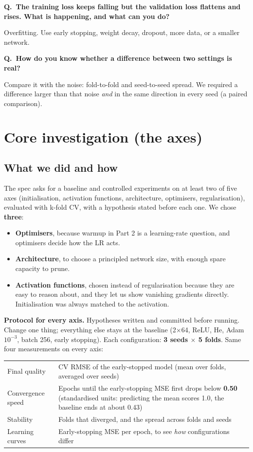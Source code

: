 \documentclass[11pt,a4paper]{article}
\newcounter{qnum}
\newcommand{\Q}[1]{\refstepcounter{qnum}\par\medskip\noindent\textbf{Q\theqnum.\ #1}\par\nopagebreak\noindent\ignorespaces}
\begin{document}
\Q{The training loss keeps falling but the validation loss flattens and rises. What is happening, and what can you do?}
Overfitting. Use early stopping, weight decay, dropout, more data, or a smaller network.

\Q{How do you know whether a difference between two settings is real?}
Compare it with the noise: fold-to-fold and seed-to-seed spread. We required a difference larger than that noise
\emph{and} in the same direction in every seed (a paired comparison).

\newpage
\section{Core investigation (the axes)}
\label{sec:core}

\subsection{What we did and how}
The spec asks for a baseline and controlled experiments on at least two of five axes (initialisation, activation
functions, architecture, optimisers, regularisation), evaluated with k-fold CV, with a hypothesis stated before each
one. We chose \textbf{three}:
\begin{itemize}
  \item \textbf{Optimisers}, because warmup in Part 2 is a learning-rate question, and optimisers decide how the LR acts.
  \item \textbf{Architecture}, to choose a principled network size, with enough spare capacity to prune.
  \item \textbf{Activation functions}, chosen instead of regularisation because they are easy to reason about, and they
        let us show vanishing gradients directly. Initialisation was always matched to the activation.
\end{itemize}

\textbf{Protocol for every axis.} Hypotheses written and committed before running. Change one thing; everything else stays
at the baseline (2$\times$64, ReLU, He, Adam $10^{-3}$, batch 256, early stopping). Each configuration: \textbf{3 seeds
$\times$ 5 folds}. Same four measurements on every axis:

\begin{tabularx}{\linewidth}{@{}lY@{}}
\toprule
Final quality & CV RMSE of the early-stopped model (mean over folds, averaged over seeds) \\
Convergence speed & Epochs until the early-stopping MSE first drops below \textbf{0.50} (standardised units: predicting the mean scores 1.0, the baseline ends at about 0.43) \\
Stability & Folds that diverged, and the spread across folds and seeds \\
Learning curves & Early-stopping MSE per epoch, to see \emph{how} configurations differ \\
\bottomrule
\end{tabularx}
\end{document}
